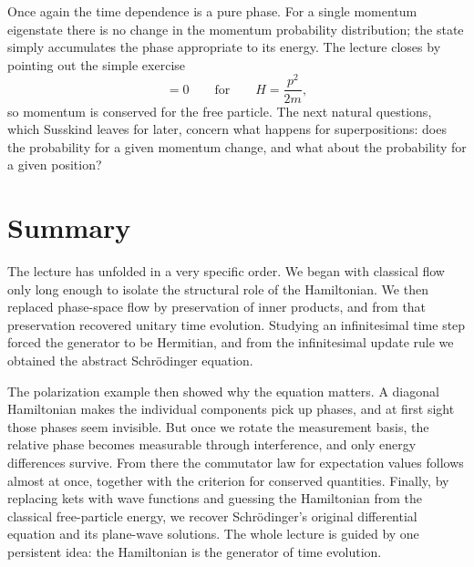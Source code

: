 Once again the time dependence is a pure phase. For a single momentum eigenstate there is no change in the momentum probability distribution; the state simply accumulates the phase appropriate to its energy. The lecture closes by pointing out the simple exercise
\begin{equation}
[p,H]=0
\qquad\text{for}\qquad
H=\frac{p^2}{2m},
\end{equation}
so momentum is conserved for the free particle. The next natural questions, which Susskind leaves for later, concern what happens for superpositions: does the probability for a given momentum change, and what about the probability for a given position?

\section{Summary}

The lecture has unfolded in a very specific order. We began with classical flow only long enough to isolate the structural role of the Hamiltonian. We then replaced phase-space flow by preservation of inner products, and from that preservation recovered unitary time evolution. Studying an infinitesimal time step forced the generator to be Hermitian, and from the infinitesimal update rule we obtained the abstract Schr\"odinger equation.

The polarization example then showed why the equation matters. A diagonal Hamiltonian makes the individual components pick up phases, and at first sight those phases seem invisible. But once we rotate the measurement basis, the relative phase becomes measurable through interference, and only energy differences survive. From there the commutator law for expectation values follows almost at once, together with the criterion for conserved quantities. Finally, by replacing kets with wave functions and guessing the Hamiltonian from the classical free-particle energy, we recover Schr\"odinger's original differential equation and its plane-wave solutions. The whole lecture is guided by one persistent idea: the Hamiltonian is the generator of time evolution.